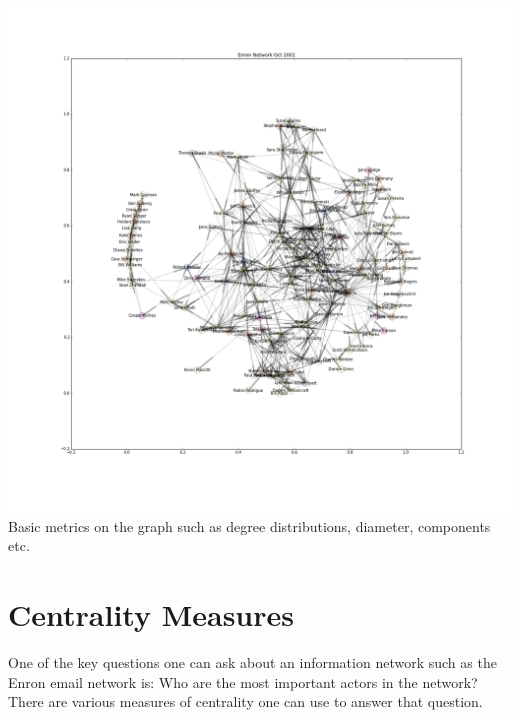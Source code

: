 \documentclass[12pt]{article}
\begin{document}
	\includegraphics[width=1\textwidth]{figureEnronOct2001}
	\\
	
	Basic metrics on the graph such as degree distributions, diameter, components etc.

\section{Centrality Measures} One of the key questions one can ask about an information network such as the Enron email network is: Who are the most important actors in the network? There are various measures of centrality one can use to answer that question.
\end{document}
